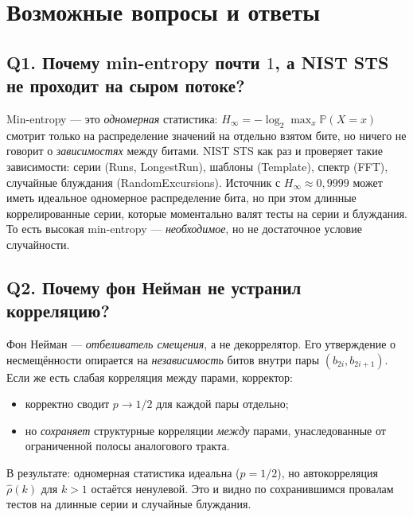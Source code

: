 \documentclass[12pt,a4paper]{extarticle}
\begin{document}
\section*{Возможные вопросы и ответы}

\subsection*{Q1. Почему min-entropy почти $1$, а NIST STS не проходит на сыром потоке?}
Min-entropy --- это \emph{одномерная} статистика: $H_\infty = -\log_2 \max_x \mathbb{P}(X{=}x)$
смотрит только на распределение значений на отдельно взятом бите, но ничего не говорит о
\emph{зависимостях} между битами. NIST STS как раз и проверяет такие зависимости: серии
(Runs, LongestRun), шаблоны (Template), спектр (FFT), случайные блуждания (Random\-Excursions).
Источник с $H_\infty \approx 0{,}9999$ может иметь идеальное одномерное распределение бита,
но при этом длинные коррелированные серии, которые моментально валят тесты на серии и
блуждания. То есть высокая min-entropy --- \emph{необходимое}, но не достаточное условие
случайности.

\subsection*{Q2. Почему фон Нейман не устранил корреляцию?}
Фон Нейман --- \emph{отбеливатель смещения}, а не декоррелятор. Его утверждение о
несмещённости опирается на \emph{независимость} битов внутри пары $(b_{2i},b_{2i+1})$.
Если же есть слабая корреляция между парами, корректор:
\begin{itemize}
  \item корректно сводит $p \to 1/2$ для каждой пары отдельно;
  \item но \emph{сохраняет} структурные корреляции \emph{между} парами, унаследованные
        от ограниченной полосы аналогового тракта.
\end{itemize}
В результате: одномерная статистика идеальна ($\hat p = 1/2$), но автокорреляция
$\hat\rho(k)$ для $k>1$ остаётся ненулевой. Это и видно по сохранившимся провалам
тестов на длинные серии и случайные блуждания.
\end{document}
